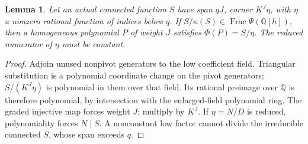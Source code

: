 \documentclass[11pt,a4paper]{amsart}
\numberwithin{equation}{section}
\theoremstyle{plain}
\newtheorem{lemma}[theorem]{Lemma}
\theoremstyle{definition}
\begin{document}
\begin{lemma}\label{lem:polynomialization}
Let an actual connected function \(S\) have span \(qJ\), corner \(K^J\eta\), with \(\eta\) a nonzero rational function of indices below \(q\).  If \(S/\kappa(S)\in\operatorname{Frac}\Psi(\mathbb Q[h])\), then a homogeneous polynomial \(P\) of weight \(J\) satisfies \(\Phi(P)=S/\eta\).  The reduced numerator of \(\eta\) must be constant.
\end{lemma}
\begin{proof}
Adjoin unused nonpivot generators to the low coefficient field.  Triangular substitution is a polynomial coordinate change on the pivot generators; \(S/(K^J\eta)\) is polynomial in them over that field.  Its rational preimage over \(\mathbb Q\) is therefore polynomial, by intersection with the enlarged-field polynomial ring.  The graded injective map forces weight \(J\); multiply by \(K^J\).  If \(\eta=N/D\) is reduced, polynomiality forces \(N\mid S\).  A nonconstant low factor cannot divide the irreducible connected \(S\), whose span exceeds \(q\).
\end{proof}
\end{document}
